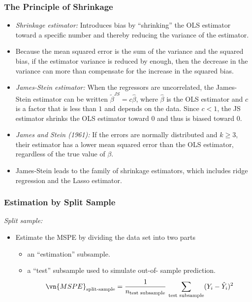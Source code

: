 \begin{frame}
\frametitle{The Principle of Shrinkage}
\begin{itemize}
\item \emph{Shrinkage estimator:} Introduces bias by ``shrinking'' the OLS estimator toward a specific number and thereby reducing the variance of the estimator. 
\item Because the mean squared error is the sum of the variance and the squared bias, if the estimator variance is reduced by enough, then the decrease in the variance can more than compensate for the increase in the squared bias. 
\item \emph{James-Stein estimator:}
When the regressors are uncorrelated, the James-Stein estimator can be written $\tilde{\beta}^{JS}=c\hat{\beta}$, where $\hat{\beta}$ is the OLS estimator and $c$ is a factor that is less than $1$ and depends on the data. Since $c<1$, the JS estimator shrinks the OLS estimator toward $0$ and thus is biased toward $0$. 
\item \emph{James and Stein (1961):}
If the errors are normally distributed and $k \geq 3$, their estimator has a lower mean squared error than the OLS estimator, regardless of the true value of $\beta$.
\item James-Stein leads to the family of shrinkage estimators, which includes ridge regression and the Lasso estimator.
\end{itemize}
\end{frame}


\begin{frame}
\frametitle{Estimation by Split Sample}
\emph{Split sample:} 
\begin{itemize}
\item Estimate the MSPE by dividing the data set into two parts
\begin{itemize}
\item an ``estimation'' subsample.
\item a ``test'' subsample used to simulate out-of- sample prediction. 
\begin{align*}
\vn{MSPE}_{\text{split-sample}} = \frac{1}{n_{\text{test subsample}}}\, \sum_{\text{test subsample}} (Y_{i}-\hat{Y}_{i})^{2}
\end{align*}
\end{itemize}
\end{itemize}
\end{frame}



